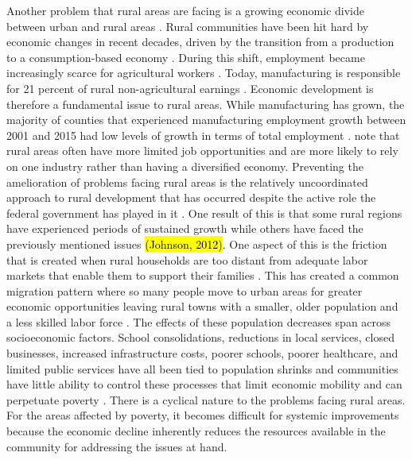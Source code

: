  Another problem that rural areas are facing is a growing economic divide between urban and rural areas \citep{bjerke_mover_2019}.  Rural communities have been hit hard by economic changes in recent decades, driven by the transition from a production to a consumption-based economy \citep{pendall_future_2016}. During this shift, employment became increasingly scarce for agricultural workers \citep{kropczynski_insights_2012}. Today, manufacturing is responsible for 21 percent of rural non-agricultural earnings \citep{low_rural_2017}. Economic development is therefore a fundamental issue to rural areas. While manufacturing has grown, the majority of counties that experienced manufacturing employment growth between 2001 and 2015 had low levels of growth in terms of total employment \citep{low_rural_2017}. \citep{blank_poverty_2005} note that rural areas often have more limited job opportunities and are more likely to rely on one industry rather than having a diversified economy. Preventing the amelioration of problems facing rural areas is the relatively uncoordinated approach to rural development that has occurred despite the active role the federal government has played in it \citep{wilson_rural_2016}. One result of this is that some rural regions have experienced periods of sustained growth while others have faced the previously mentioned issues \hl{(Johnson, 2012)}. One aspect of this is the friction that is created when rural households are too distant from adequate labor markets that enable them to support their families \citep{sparks_poverty_2013}. This has created a common migration pattern where so many people move to urban areas for greater economic opportunities leaving rural towns with a smaller, older population and a less skilled labor force \citep{bjerke_mover_2019}. The effects of these population decreases span across socioeconomic factors. School consolidations, reductions in local services, closed businesses, increased infrastructure costs, poorer schools, poorer healthcare, and limited public services have all been tied to population shrinks and communities have little ability to control these processes that limit economic mobility and can perpetuate poverty \citep{martinez_rural_2021}. There is a cyclical nature to the problems facing rural areas. For the areas affected by poverty, it becomes difficult for systemic improvements because the economic decline inherently reduces the resources available in the community for addressing the issues at hand.

